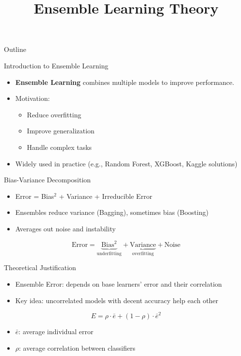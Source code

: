 \documentclass{beamer}
\title{Ensemble Learning Theory}
\subtitle{}
\date{}
\begin{document}
{
\begin{frame}
    \titlepage
\end{frame}
}

\begin{frame}{Outline}
    \tableofcontents
\end{frame}


\begin{frame}{Introduction to Ensemble Learning}
\begin{itemize}
    \item \textbf{Ensemble Learning} combines multiple models to improve performance.
    \item Motivation:
    \begin{itemize}
        \item Reduce overfitting
        \item Improve generalization
        \item Handle complex tasks
    \end{itemize}
    \item Widely used in practice (e.g., Random Forest, XGBoost, Kaggle solutions)
\end{itemize}
\end{frame}

\begin{frame}{Bias-Variance Decomposition}
\begin{itemize}
    \item Error = Bias$^2$ + Variance + Irreducible Error
    \item Ensembles reduce variance (Bagging), sometimes bias (Boosting)
    \item Averages out noise and instability
\end{itemize}
\[
\text{Error} = \underbrace{\text{Bias}^2}_{\text{underfitting}} + \underbrace{\text{Variance}}_{\text{overfitting}} + \text{Noise}
\]
\end{frame}

\begin{frame}{Theoretical Justification}
\begin{itemize}
    \item Ensemble Error: depends on base learners' error and their correlation
    \item Key idea: uncorrelated models with decent accuracy help each other
\end{itemize}
\[
E = \rho \cdot \bar{e} + (1 - \rho) \cdot \bar{e}^2
\]
\begin{itemize}
    \item $\bar{e}$: average individual error
    \item $\rho$: average correlation between classifiers
\end{itemize}
\end{frame}
\end{document}
